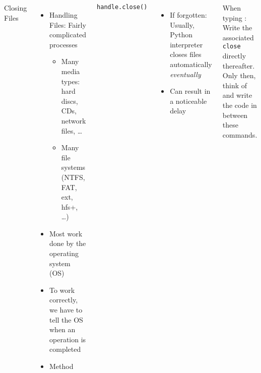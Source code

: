 \begin{frame}[fragile]
%
\begin{columns}[T]
\begin{Large}
	{Closing Files}
	\vspace{6pt}
\end{Large}
%
\begin{itemize}
\item Handling Files: Fairly complicated processes
	\begin{itemize}
	\item Many media types: hard discs, CDs, network files, \ldots
	\item Many file systems (NTFS, FAT, ext, hfs+, \ldots)
	\end{itemize}
\item Most work done by the operating system (OS)
\item To work correctly, we have to tell the OS when an operation is completed
\item[\Thus] Method 
\end{itemize}
%
\begin{codebox}
\begin{verbatim}
handle.close()
\end{verbatim}
\end{codebox}
%
\begin{itemize}
\item If forgotten: Usually, Python interpreter closes files automatically \emph{eventually}
\item Can result in a noticeable delay
\end{itemize}
%
\begin{hintbox}
\small
When typing : Write the associated \texttt{close} directly thereafter. Only then, think of and write the code in between these commands.
\end{hintbox}
\end{columns}
%
\end{frame}



